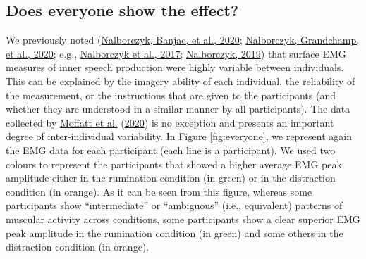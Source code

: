 \documentclass[
  english,
  man, donotrepeattitle,floatsintext]{apa6}
\begin{document}
\hypertarget{does-everyone-show-the-effect}{%
\subsection{Does everyone show the effect?}\label{does-everyone-show-the-effect}}

We previously noted (\protect\hyperlink{ref-nalborczyk_dissociating_2020}{Nalborczyk, Banjac, et al., 2020}; \protect\hyperlink{ref-nalborczyk_can_2020}{Nalborczyk, Grandchamp, et al., 2020}; e.g., \protect\hyperlink{ref-nalborczyk_orofacial_2017}{Nalborczyk et al., 2017}; \protect\hyperlink{ref-nalborczyk_understanding_2019}{Nalborczyk, 2019}) that surface EMG measures of inner speech production were highly variable between individuals. This can be explained by the imagery ability of each individual, the reliability of the measurement, or the instructions that are given to the participants (and whether they are understood in a similar manner by all participants). The data collected by \protect\hyperlink{ref-moffatt_inner_2020}{Moffatt et al.} (\protect\hyperlink{ref-moffatt_inner_2020}{2020}) is no exception and presents an important degree of inter-individual variability. In Figure \ref{fig:everyone}, we represent again the EMG data for each participant (each line is a participant). We used two colours to represent the participants that showed a higher average EMG peak amplitude either in the rumination condition (in green) or in the distraction condition (in orange). As it can be seen from this figure, whereas some participants show ``intermediate'' or ``ambiguous'' (i.e., equivalent) patterns of muscular activity across conditions, some participants show a clear superior EMG peak amplitude in the rumination condition (in green) and some others in the distraction condition (in orange).
\end{document}
